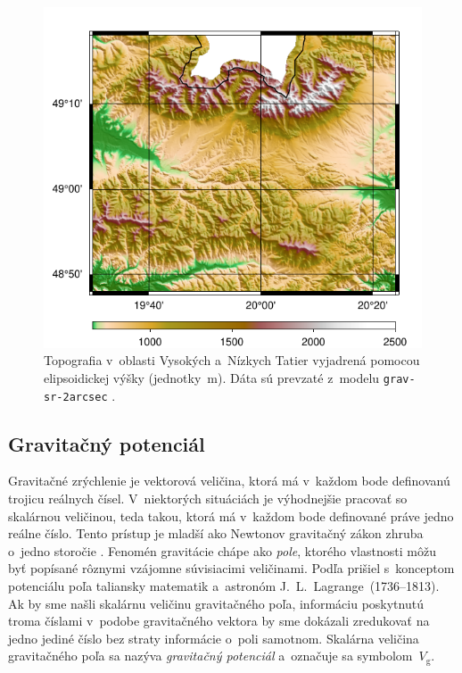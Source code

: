 \documentclass[a4paper, 12pt]{book}
\newcommand{\gidx}{\mathrm g}
\begin{document}
\begin{figure}
\centering
\includegraphics{./fig-h-grav-sr-2arcsec.pdf}
\caption{Topografia v~oblasti Vysokých a~Nízkych Tatier vyjadrená pomocou 
elipsoidickej výšky (jednotky~m).  Dáta sú prevzaté z~modelu 
\texttt{grav-sr-2arcsec} \parencite{GravSR2arcsec}.}
\label{fig:h_grav_sr_2arcsec}
\end{figure}







\subsection{Gravitačný potenciál}
\label{sec:vg}

Gravitačné zrýchlenie je vektorová veličina, ktorá má v~každom bode definovanú 
trojicu reálnych čísel.  V~niektorých situáciách je výhodnejšie pracovať so 
skalárnou veličinou, teda takou, ktorá má v~každom bode definované práve jedno 
reálne číslo.  Tento prístup je mladší ako Newtonov gravitačný zákon zhruba 
o~jedno storočie \parencite{MacMillan1930,Jekeli2015}.  Fenomén gravitácie 
chápe ako \emph{pole}, ktorého vlastnosti môžu byť popísané rôznymi vzájomne 
súvisiacimi veličinami.  Podľa \textcite{MacMillan1930} prišiel s~konceptom 
potenciálu poľa taliansky matematik a~astronóm J.~L.~Lagrange~(1736--1813).  Ak 
by sme našli skalárnu veličinu gravitačného poľa, informáciu poskytnutú troma 
číslami v~podobe gravitačného vektora by sme dokázali zredukovať na jedno 
jediné číslo bez straty informácie o~poli samotnom.  Skalárna veličina 
gravitačného poľa sa nazýva \emph{gravitačný potenciál} a~označuje sa 
symbolom~$V_\gidx$.
\end{document}

